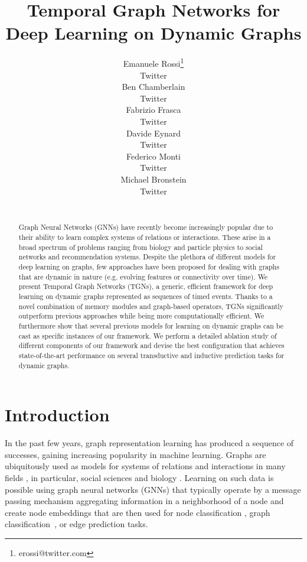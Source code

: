 \documentclass{article}
\title{Temporal Graph Networks for Deep Learning on Dynamic Graphs}
\author{%
  Emanuele Rossi\thanks{erossi@twitter.com} \\
  Twitter \\
   \And
   Ben Chamberlain \\
   Twitter \\
   \And
   Fabrizio Frasca \\
   Twitter \\
   \AND
   Davide Eynard \\
   Twitter \\
   \And
   Federico Monti \\
   Twitter \\
   \And
   Michael Bronstein \\
   Twitter \\
   \\
}
\begin{document}
\maketitle

\begin{abstract}
Graph Neural Networks (GNNs) have recently become increasingly popular due to their ability to learn complex systems of relations or interactions. These arise in a broad spectrum of problems ranging from biology and particle physics to social networks and recommendation systems. Despite the plethora of different models for deep learning on graphs, few approaches have been proposed for dealing with graphs that are dynamic in nature (e.g. evolving features or connectivity over time). 
%
We present Temporal Graph Networks (TGNs), a generic, efficient framework for deep learning on dynamic graphs represented as sequences of timed events. Thanks to a novel combination of memory modules and graph-based operators, TGNs significantly outperform previous approaches while being more computationally efficient. 
%
We furthermore show that several previous models for learning on dynamic graphs can be cast as specific instances of our framework. 
%
We perform a detailed ablation study of different components of our framework and devise the best configuration that achieves state-of-the-art performance on several transductive and inductive prediction tasks for dynamic graphs. 

\end{abstract}

\section{Introduction}

In the past few years, graph representation learning \citep{bronstein2017geometric,hamilton2017representation,battaglia2018relational} has produced a sequence of successes, gaining increasing popularity in machine learning. 
%
Graphs are ubiquitously used as models for systems of relations and interactions in many fields \citep{battaglia2016interaction,qi2018learning,Monti2016GeometricDL,choma2018graph,NIPS2015_5954,pmlr-v70-gilmer17a,parisot2018disease,rossi2019ncrna}, in particular, social sciences \citep{pinsage,monti2019fake,rossi2020sign} and biology \citep{zitnik2018modeling,veselkov2019hyperfoods,gainza2019deciphering}. Learning on such data is possible using graph neural networks (GNNs) 
\citep{graphsage}
that typically operate by a message passing mechanism \citep{battaglia2018relational} aggregating information in a neighborhood of a node and create node embeddings that are then used for node classification \citep{Monti2016GeometricDL, DBLP:conf/iclr/VelickovicCCRLB18, Kipf:2016tc}, graph classification~\citep{pmlr-v70-gilmer17a}, or edge prediction \citep{zhang2018link} tasks. 
\end{document}
